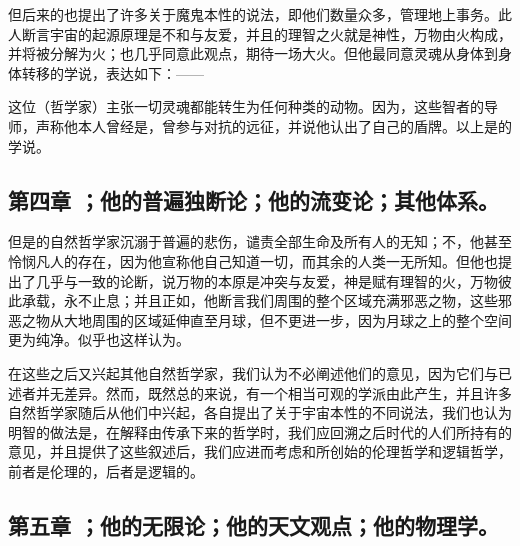 但后来的也提出了许多关于魔鬼本性的说法，即他们数量众多，管理地上事务。此人断言宇宙的起源原理是不和与友爱，并且的理智之火就是神性，万物由火构成，并将被分解为火；也几乎同意此观点，期待一场大火。但他最同意灵魂从身体到身体转移的学说，表达如下：——\par

\par

这位（哲学家）主张一切灵魂都能转生为任何种类的动物。因为，这些智者的导师，声称他本人曾经是，曾参与对抗的远征，并说他认出了自己的盾牌。以上是的学说。\par


\subsection{第四章 ；他的普遍独断论；他的流变论；其他体系。}

但是的自然哲学家沉溺于普遍的悲伤，谴责全部生命及所有人的无知；不，他甚至怜悯凡人的存在，因为他宣称他自己知道一切，而其余的人类一无所知。但他也提出了几乎与一致的论断，说万物的本原是冲突与友爱，神是赋有理智的火，万物彼此承载，永不止息；并且正如，他断言我们周围的整个区域充满邪恶之物，这些邪恶之物从大地周围的区域延伸直至月球，但不更进一步，因为月球之上的整个空间更为纯净。似乎也这样认为。\par

在这些之后又兴起其他自然哲学家，我们认为不必阐述他们的意见，因为它们与已述者并无差异。然而，既然总的来说，有一个相当可观的学派由此产生，并且许多自然哲学家随后从他们中兴起，各自提出了关于宇宙本性的不同说法，我们也认为明智的做法是，在解释由传承下来的哲学时，我们应回溯之后时代的人们所持有的意见，并且提供了这些叙述后，我们应进而考虑和所创始的伦理哲学和逻辑哲学，前者是伦理的，后者是逻辑的。\par


\subsection{第五章 ；他的无限论；他的天文观点；他的物理学。}

